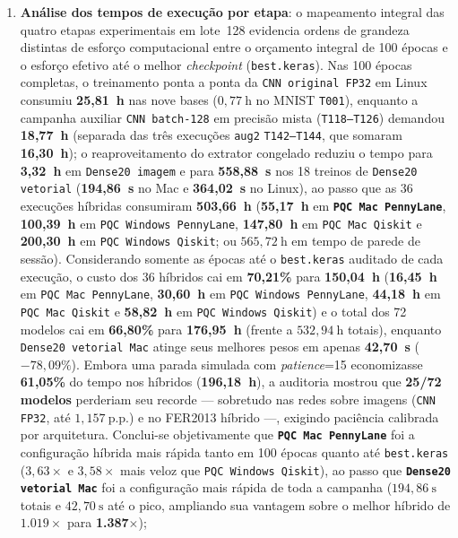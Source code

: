 \documentclass[
    12pt,
    openright,
    oneside,
    a4paper,
    english,
    brazil
]{abntex2}
\begin{document}
\begin{enumerate}
    \item \textbf{Análise dos tempos de execução por etapa}: o mapeamento integral das quatro etapas experimentais em lote~128 evidencia ordens de grandeza distintas de esforço computacional entre o orçamento integral de 100 épocas e o esforço efetivo até o melhor \textit{checkpoint} (\texttt{best.keras}). Nas 100 épocas completas, o treinamento ponta a ponta da \texttt{CNN original FP32} em Linux consumiu \textbf{25,81~h} nas nove bases (\(0{,}77~\text{h}\) no MNIST \texttt{T001}), enquanto a campanha auxiliar \texttt{CNN batch-128} em precisão mista (\texttt{T118--T126}) demandou \textbf{18,77~h} (separada das três execuções \texttt{aug2} \texttt{T142--T144}, que somaram \textbf{16,30~h}); o reaproveitamento do extrator congelado reduziu o tempo para \textbf{3,32~h} em \texttt{Dense20 imagem} e para \textbf{558,88~s} nos 18 treinos de \texttt{Dense20 vetorial} (\textbf{194,86~s} no Mac e \textbf{364,02~s} no Linux), ao passo que as 36 execuções híbridas consumiram \textbf{503,66~h} (\textbf{55,17~h} em \textbf{\texttt{PQC Mac PennyLane}}, \textbf{100,39~h} em \texttt{PQC Windows PennyLane}, \textbf{147,80~h} em \texttt{PQC Mac Qiskit} e \textbf{200,30~h} em \texttt{PQC Windows Qiskit}; ou \(565{,}72~\text{h}\) em tempo de parede de sessão). Considerando somente as épocas até o \texttt{best.keras} auditado de cada execução, o custo dos 36 híbridos cai em \textbf{70,21\%} para \textbf{150,04~h} (\textbf{16,45~h} em \texttt{PQC Mac PennyLane}, \textbf{30,60~h} em \texttt{PQC Windows PennyLane}, \textbf{44,18~h} em \texttt{PQC Mac Qiskit} e \textbf{58,82~h} em \texttt{PQC Windows Qiskit}) e o total dos 72 modelos cai em \textbf{66,80\%} para \textbf{176,95~h} (frente a \(532{,}94~\text{h}\) totais), enquanto \texttt{Dense20 vetorial Mac} atinge seus melhores pesos em apenas \textbf{42,70~s} (\(-78{,}09\%\)). Embora uma parada simulada com \textit{patience}=15 economizasse \textbf{61,05\%} do tempo nos híbridos (\textbf{196,18~h}), a auditoria mostrou que \textbf{25/72 modelos} perderiam seu recorde --- sobretudo nas redes sobre imagens (\texttt{CNN FP32}, até \(1{,}157~\text{p.p.}\)) e no FER2013 híbrido ---, exigindo paciência calibrada por arquitetura. Conclui-se objetivamente que \textbf{\texttt{PQC Mac PennyLane}} foi a configuração híbrida mais rápida tanto em 100 épocas quanto até \texttt{best.keras} (\(3{,}63\times\) e \(3{,}58\times\) mais veloz que \texttt{PQC Windows Qiskit}), ao passo que \textbf{\texttt{Dense20 vetorial Mac}} foi a configuração mais rápida de toda a campanha (\(194{,}86~\text{s}\) totais e \(42{,}70~\text{s}\) até o pico, ampliando sua vantagem sobre o melhor híbrido de \(1.019\times\) para \textbf{1.387\(\times\)});

\end{enumerate}
\end{document}
